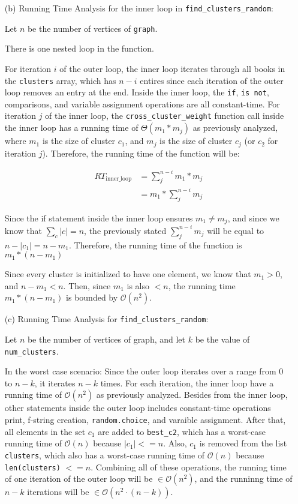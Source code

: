 \documentclass[11pt]{article}
\newcommand{\cO}{\mathcal{O}}
\begin{document}
\begin{enumerate}
\begin{enumerate}
\item[(b)]
Running Time Analysis for the inner loop in \texttt{find\_clusters\_random}:

Let $n$ be the number of vertices of \texttt{graph}.

There is one nested loop in the function.

For iteration $i$ of the outer loop, the inner loop iterates through all books in the \texttt{clusters} array, which has $n - i$ entires since each iteration of the outer loop removes an entry at the end. Inside the inner loop, the \texttt{if}, \texttt{is not}, comparisons, and variable assignment operations are all constant-time. For iteration $j$ of the inner loop, the \texttt{cross\_cluster\_weight} function call inside the inner loop has a running time of $\Theta(m_1 * m_j)$ as previously analyzed, where $m_1$ is the size of cluster $c_1$, and $m_j$ is the size of cluster $c_j$ (or $c_2$ for iteration $j$). Therefore, the running time of the function will be: 


\begin{align}
RT_{\text{inner\_loop}} &= \sum_j^{n-i} m_1 * m_j \\
&= m_1 * \sum_j^{n-i} m_j
\end{align}

Since the if statement inside the inner loop ensures $m_1 \neq m_j$, and since we know that $\sum_c |c| = n$, the previously stated $\sum_j^{n-i} m_j$ will be equal to $n - |c_1| = n - m_1$. Therefore, the running time of the function is $m_1 * (n - m_1)$

Since every cluster is initialized to have one element, we know that $m_1 > 0$, and $n - m_1 < n$. Then, since $m_1$ is also $< n$, the running time $m_1 * (n - m_1)$ is bounded by $\cO(n^2)$.

\item[(c)]
Running Time Analysis for \texttt{find\_clusters\_random}:

Let $n$ be the number of vertices of graph, and let $k$ be the value of \texttt{num\_clusters}.

In the worst case scenario: Since the outer loop iterates over a range from $0$ to $n - k$, it iterates $n - k$ times. For each iteration, the inner loop have a running time of $\cO(n^2)$ as previously analyzed. Besides from the inner loop, other statements inside the outer loop includes constant-time operations print, f-string creation, \texttt{random.choice}, and varaible assignment. After that, all elements in the set $c_1$ are added to \texttt{best\_c2}, which has a worst-case running time of $\cO(n)$ because $|c_1| <= n$. Also, $c_1$ is removed from the list \texttt{clusters}, which also has a worst-case running time of $\cO(n)$ because \texttt{len(clusters)} $<= n$. Combining all of these operations, the running time of one iteration of the outer loop will be $\in \cO(n^2)$, and the runninng time of $n - k$ iterations will be $\in \cO(n^2 \cdot (n - k))$.


\end{enumerate}
\end{enumerate}
\end{document}
